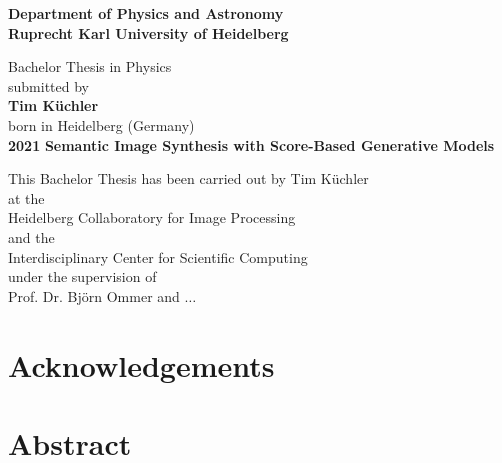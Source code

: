 \documentclass[a4paper, 12pt, oneside, BCOR=0cm]{scrbook}
\begin{document}
\begin{titlepage}
\begin{center}
    \Large\textbf{Department of Physics and Astronomy\\Ruprecht Karl University of Heidelberg}
    
    \vfill
    
    \large
    Bachelor Thesis in Physics\\
    submitted by\\
    \vspace{0.5cm}
    \Large\textbf{Tim Küchler}\\
    \normalsize
    \vspace{0.5cm}
    born in Heidelberg (Germany)\\
    \vspace{0.5cm}
    \Large\textbf{2021}
    \normalsize
    \afterpage{\blankpage}
    \newpage
    \thispagestyle{empty}
    \Large\textbf{Semantic Image Synthesis with Score-Based Generative Models}
    
    \vfill
    
    \large
    This Bachelor Thesis has been carried out by Tim Küchler\\
    at the\\
    Heidelberg Collaboratory for Image Processing\\
    and the\\
    Interdisciplinary Center for Scientific Computing\\
    under the supervision of\\
    Prof. Dr. Björn Ommer and $\dots$
    \afterpage{\blankpage}
\end{center}
\end{titlepage}
%
\frontmatter

\chapter*{Acknowledgements}
\thispagestyle{empty}
%
\afterpage{\blankpage}

\chapter*{Abstract}

\thispagestyle{empty}
\afterpage{\blankpage}

\setcounter{tocdepth}{1}
\tableofcontents
\thispagestyle{empty}
\afterpage{\blankpage}
\end{document}
